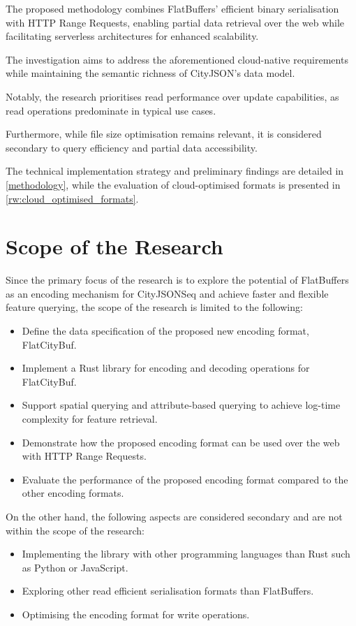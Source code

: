 The proposed methodology combines FlatBuffers' efficient binary serialisation with HTTP Range Requests, enabling partial data retrieval over the web while facilitating serverless architectures for enhanced scalability.

The investigation aims to address the aforementioned cloud-native requirements while maintaining the semantic richness of CityJSON's data model.

Notably, the research prioritises read performance over update capabilities, as read operations predominate in typical use cases.

Furthermore, while file size optimisation remains relevant, it is considered secondary to query efficiency and partial data accessibility.

The technical implementation strategy and preliminary findings are detailed in \autoref{methodology}, while the evaluation of cloud-optimised formats is presented in \autoref{rw:cloud_optimised_formats}.

\section{Scope of the Research}
\label{introduction:scope_of_the_research}

Since the primary focus of the research is to explore the potential of FlatBuffers as an encoding mechanism for CityJSONSeq and achieve faster and flexible feature querying, the scope of the research is limited to the following:

\begin{itemize}
  \item Define the data specification of the proposed new encoding format, FlatCityBuf.
  \item Implement a Rust library for encoding and decoding operations for FlatCityBuf.
  \item Support spatial querying and attribute-based querying to achieve log-time complexity for feature retrieval.
  \item Demonstrate how the proposed encoding format can be used over the web with HTTP Range Requests.
  \item Evaluate the performance of the proposed encoding format compared to the other encoding formats.
\end{itemize}

On the other hand, the following aspects are considered secondary and are not within the scope of the research:
\begin{itemize}
  \item Implementing the library with other programming languages than Rust such as Python or JavaScript.
  \item Exploring other read efficient serialisation formats than FlatBuffers.
  \item Optimising the encoding format for write operations.
\end{itemize}

